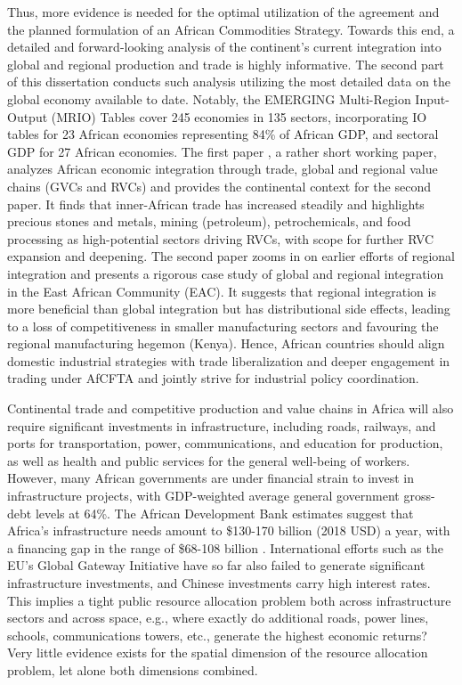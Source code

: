 \documentclass[a4paper]{article}
\begin{document}
Thus, more evidence is needed for the optimal utilization of the agreement and the planned formulation of an African Commodities Strategy. Towards this end, a detailed and forward-looking analysis of the continent's current integration into global and regional production and trade is highly informative. The second part of this dissertation conducts such analysis utilizing the most detailed data on the global economy available to date. Notably, the EMERGING Multi-Region Input-Output (MRIO) Tables \citep{huo2022full} cover 245 economies in 135 sectors, incorporating IO tables for 23 African economies representing 84\% of African GDP, and sectoral GDP for 27 African economies. The first paper \citep{krantz2024africas}, a rather short working paper, analyzes African economic integration through trade, global and regional value chains (GVCs and RVCs) and provides the continental context for the second paper. It finds that inner-African trade has increased steadily and highlights precious stones and metals, mining (petroleum), petrochemicals, and food processing as high-potential sectors driving RVCs, with scope for further RVC expansion and deepening. The second paper \citep{krantz2024patterns} zooms in on earlier efforts of regional integration and presents a rigorous case study of global and regional integration in the East African Community (EAC). It suggests that regional integration is more beneficial than global integration but has distributional side effects, leading to a loss of competitiveness in smaller manufacturing sectors and favouring the regional manufacturing hegemon (Kenya). Hence, African countries should align domestic industrial strategies with trade liberalization and deeper engagement in trading under AfCFTA and jointly strive for industrial policy coordination. \newline    


Continental trade and competitive production and value chains in Africa will also require significant investments in infrastructure, including roads, railways, and ports for transportation, power, communications, and education for production, as well as health and public services for the general well-being of workers. However, many African governments are under financial strain to invest in infrastructure projects, with GDP-weighted average general government gross-debt levels at 64\%. The African Development Bank estimates suggest that Africa's infrastructure needs amount to \$130-170 billion (2018 USD) a year, with a financing gap in the range of \$68-108 billion \citep{african2018africa}. International efforts such as the EU's Global Gateway Initiative have so far also failed to generate significant infrastructure investments, and Chinese investments carry high interest rates. This implies a tight public resource allocation problem both across infrastructure sectors and across space, e.g., where exactly do additional roads, power lines, schools, communications towers, etc., generate the highest economic returns? Very little evidence exists for the spatial dimension of the resource allocation problem, let alone both dimensions combined. \newline 
\end{document}
